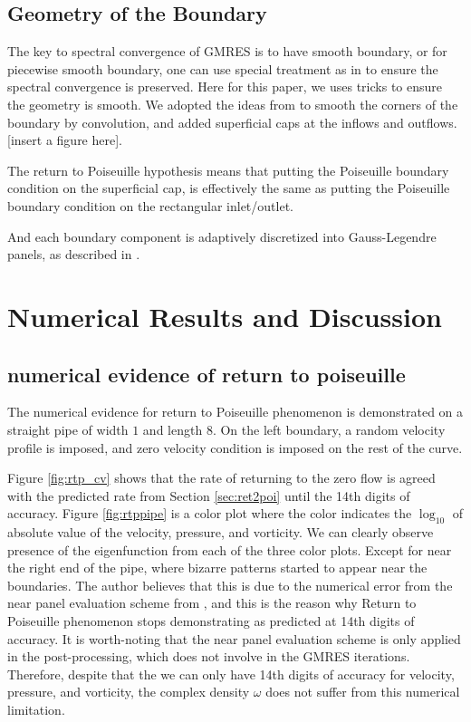 \documentclass[10pt,twocolumn]{article}
\begin{document}
\subsection{Geometry of the Boundary}

The key to spectral convergence of GMRES is to have smooth boundary, 
or for piecewise smooth boundary, one can use special treatment as in \cite{wuSolutionStokesFlow2020}
to ensure the spectral convergence is preserved. Here for this paper, we uses tricks to ensure 
the geometry is smooth. 
We adopted the ideas from 
\cite{epsteinSmoothedCornersScattered2016,baggeHighlyAccurateSpecial2021} 
to smooth the corners of the boundary by convolution, and added superficial caps at the 
inflows and outflows. [insert a figure here]. 

The return to Poiseuille hypothesis means that putting the Poiseuille boundary condition on the 
superficial cap, is effectively the same as putting the Poiseuille boundary condition on the 
rectangular inlet/outlet. 


And each boundary component is adaptively discretized into Gauss-Legendre panels, as described in
\cite{wuSolutionStokesFlow2020}. 


\section{Numerical Results and Discussion\label{sec:numericalresults}}
\subsection{numerical evidence of return to poiseuille}


The numerical evidence for return to Poiseuille phenomenon is 
demonstrated on a straight pipe of width $1$ and length $8$. 
On the left boundary, a random velocity profile is imposed, 
and zero velocity condition is imposed on the rest of the curve. 

Figure \ref{fig:rtp_cv} shows that the rate of returning 
to the zero flow is agreed with the 
predicted rate from Section \ref{sec:ret2poi} until the 14th digits of accuracy. 
Figure \ref{fig:rtppipe} is a color
plot where the color indicates the $\log_{10}$ of absolute value of the velocity, 
pressure, and vorticity. We can clearly observe presence of the eigenfunction from
each of the three color plots. Except for near the right end of the pipe, where 
bizarre patterns started to appear near the boundaries. The author believes that
this is due to the numerical error from the near panel evaluation scheme from 
\cite{wuSolutionStokesFlow2020}, and this is the reason why Return to Poiseuille 
phenomenon stops demonstrating as predicted at 14th digits of accuracy. 
It is worth-noting that the near panel evaluation scheme is only applied in the 
post-processing, which does not involve in the GMRES iterations. Therefore, despite
that the we can only have 14th digits of accuracy for velocity, pressure, and vorticity,
the complex density $\omega$ does not suffer from this numerical limitation. 
\end{document}
